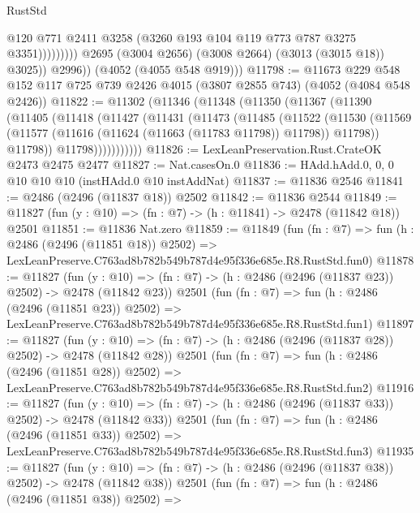 \begin{lexlean}{RustStd}
\begin{coremodule}
                              @120
                              @771
                              @2411
                              @3258
                              (@3260 @193 @104 @119 @773 @787 @3275 @3351)))))))))
              @2695
              (@3004 @2656)
              (@3008 @2664)
              (@3013 (@3015 @18))
              @3025))
          @2996))
      (@4052 (@4055 @548 @919)))
@11798 := @11673
    @229
    @548
    @152
    @117
    @725
    @739
    @2426
    @4015
    (@3807 @2855 @743)
    (@4052 (@4084 @548 @2426))
@11822 := @11302
    (@11346
      (@11348
        (@11350
          (@11367
            (@11390
              (@11405
                (@11418
                  (@11427
                    (@11431
                      (@11473
                        (@11485
                          (@11522
                            (@11530
                              (@11569
                                (@11577 (@11616 (@11624 (@11663 (@11783 @11798)) @11798)) @11798))
                              @11798))
                          @11798)))))))))))
@11826 := LexLeanPreservation.Rust.CrateOK @2473 @2475 @2477
@11827 := Nat.casesOn.{0}
@11836 := HAdd.hAdd.{0, 0, 0} @10 @10 @10 (instHAdd.{0} @10 instAddNat)
@11837 := @11836 @2546
@11841 := @2486 (@2496 (@11837 @18)) @2502
@11842 := @11836 @2544
@11849 := @11827 (fun (y : @10) => (fn : @7) -> (h : @11841) -> @2478 (@11842 @18)) @2501
@11851 := @11836 Nat.zero
@11859 := @11849
    (fun (fn : @7) =>
    fun (h : @2486 (@2496 (@11851 @18)) @2502) =>
    LexLeanPreserve.C763ad8b782b549b787d4e95f336e685e.R8.RustStd.fun0)
@11878 := @11827
    (fun (y : @10) => (fn : @7) -> (h : @2486 (@2496 (@11837 @23)) @2502) -> @2478 (@11842 @23))
    @2501
    (fun (fn : @7) =>
    fun (h : @2486 (@2496 (@11851 @23)) @2502) =>
    LexLeanPreserve.C763ad8b782b549b787d4e95f336e685e.R8.RustStd.fun1)
@11897 := @11827
    (fun (y : @10) => (fn : @7) -> (h : @2486 (@2496 (@11837 @28)) @2502) -> @2478 (@11842 @28))
    @2501
    (fun (fn : @7) =>
    fun (h : @2486 (@2496 (@11851 @28)) @2502) =>
    LexLeanPreserve.C763ad8b782b549b787d4e95f336e685e.R8.RustStd.fun2)
@11916 := @11827
    (fun (y : @10) => (fn : @7) -> (h : @2486 (@2496 (@11837 @33)) @2502) -> @2478 (@11842 @33))
    @2501
    (fun (fn : @7) =>
    fun (h : @2486 (@2496 (@11851 @33)) @2502) =>
    LexLeanPreserve.C763ad8b782b549b787d4e95f336e685e.R8.RustStd.fun3)
@11935 := @11827
    (fun (y : @10) => (fn : @7) -> (h : @2486 (@2496 (@11837 @38)) @2502) -> @2478 (@11842 @38))
    @2501
    (fun (fn : @7) =>
    fun (h : @2486 (@2496 (@11851 @38)) @2502) =>

\end{coremodule}
\end{lexlean}

